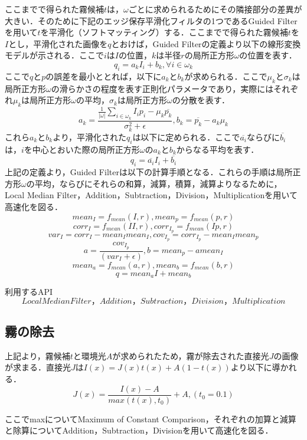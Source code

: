 \documentclass{jsarticle}
\begin{document}
ここまでで得られた霧候補$t$は，$\omega$ごとに求められるためにその隣接部分の差異が大きい．そのために下記のエッジ保存平滑化フィルタの1つであるGuided Filter\cite{2}を用いて$t$を平滑化（ソフトマッティング）する．ここまでで得られた霧候補$t$を$I$とし，平滑化された画像を$q$とおけば，Guided Filterの定義より以下の線形変換モデルが示される．ここで$i$は$I$の位置，$k$は半径$r$の局所正方形$\omega$の位置を表す．
\[
q_i = a_k I_i + b_k, \forall i \in \omega_k
\]
ここで$q$と$p$の誤差を最小ととれば，以下に$a_k$と$b_k$が求められる．ここで$\mu_k$と$\sigma_k$は局所正方形$\omega$の滑らかさの程度を表す正則化パラメータであり，実際にはそれぞれ$\mu_k$は局所正方形$\omega$の平均，$\sigma_k$は局所正方形$\omega$の分散を表す．
\[
a_k = \frac{\frac{1}{|\omega|} \sum_{i \in \omega_k} I_i p_i - \mu_k \overline{p_k}}{\sigma_k^2 + \epsilon},
b_k = \overline{p_k} - a_k \mu_k
\]
これら$a_k$と$b_k$より，平滑化された$q_i$は以下に定められる．ここで$\overline{a_i}$ならびに$\overline{b_i}$は，$i$を中心とおいた際の局所正方形$\omega$の$a_k$と$b_k$からなる平均を表す．
\[
q_i = \overline{a_i} I_i + \overline{b_i}
\]
上記の定義より，Guided Filterは以下の計算手順となる．これらの手順は局所正方形$\omega$の平均，ならびにそれらの和算，減算，積算，減算よりなるために， Local Median Filter，Addition，Subtraction，Division，Multiplicationを用いて高速化を図る．
\[
mean_I = f_{mean}(I,r), mean_p = f_{mean}(p,r)
\]
\[
corr_I = f_{mean}(II,r), corr_{I_{p}} = f_{mean}(Ip,r)
\]
\[
var_I = corr_I - mean_I  mean_I, cov_{I_{p}} = corr_{I_{p}} - mean_I mean_p
\]
\[
a = \frac{cov_{I_{p}}}{(var_I + \epsilon)}, b = mean_p - a  mean_I
\]
\[
mean_a = f_{mean}(a,r), mean_b = f_{mean}(b,r)
\]
\[
q = mean_a  I + mean_b
\]

\begin{itembox}[l]{利用するAPI}
\[
Local Median Filter，Addition，Subtraction，Division，Multiplication
\]
\end{itembox}

\subsection{霧の除去}
\label{霧の除去}

上記より，霧候補$t$と環境光$A$が求められたため，霧が除去された直接光$J$の画像が求まる．直接光$J$は$I(x)=J(x)t(x)+A(1-t(x))$より以下に導かれる．
\[
J(x)=\frac{I(x)-A}{max(t(x), t_0)} + A,(t_0=0.1)
\]

ここでmaxについてMaximum of Constant Comparison，それぞれの加算と減算と除算についてAddition，Subtraction，Divisionを用いて高速化を図る．
\end{document}

